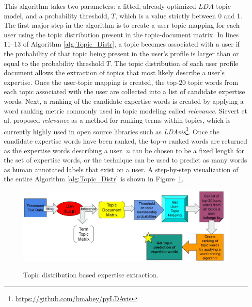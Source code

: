            This algorithm takes two parameters: a fitted, already optimized $LDA$ topic model, and a probability threshold, $T$, which is a value strictly between 0 and 1. The first major step in the algorithm is to create a user-topic mapping for each user using the topic distribution present in the topic-document matrix. In lines 11--13 of Algorithm \ref{alg:Topic_Distr}, a topic becomes associated with a user if the probability of that topic being present in the user's profile is larger than or equal to the probability threshold $T$. The topic distribution of each user profile document allows the extraction of topics that most likely describe a user's expertise. Once the user-topic mapping is created, the top-20 topic words from each topic associated with the user are collected into a list of candidate expertise words. Next, a ranking of the candidate expertise words is created by applying a word ranking metric commonly used in topic modeling called \emph{relevance}. Sievert et al. \cite{sievert2014ldavis} proposed \emph{relevance} as a method for ranking terms within topics, which is currently highly used in open source libraries such as \emph{LDAvis}\footnote{\url{https://github.com/bmabey/pyLDAvis}}. Once the candidate expertise words have been ranked, the top-$n$ ranked words are returned as the expertise words describing a user. $n$ can be chosen to be a fixed length for the set of expertise words, or the technique can be used to predict as many words as human annotated labels that exist on a user. A step-by-step visualization of the entire Algorithm \ref{alg:Topic_Distr} is shown in Figure~\ref{fig:technique1}.
            
            \begin{figure}[!ht]
              \centering
              \includegraphics[width=\textwidth]{figures/technique1.JPG}\\
              \caption{Topic distribution based expertise extraction.}
              \label{fig:technique1}
            \end{figure}
            
